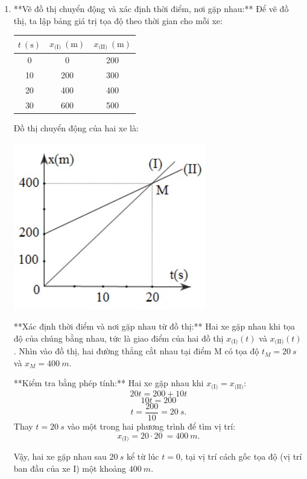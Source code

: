 \begin{vd}
{\begin{enumerate}[label=\alph*)]
			\item **Vẽ đồ thị chuyển động và xác định thời điểm, nơi gặp nhau:**
			Để vẽ đồ thị, ta lập bảng giá trị tọa độ theo thời gian cho mỗi xe:
			\begin{center}
				\begin{tabular}{|c|c|c|}
					\hline
					$t\ (\si{\second})$ & $x_{\text{(I)}}\ (\si{\meter})$ & $x_{\text{(II)}}\ (\si{\meter})$ \\
					\hline
					0 & 0 & 200 \\
					10 & 200 & 300 \\
					20 & 400 & 400 \\
					30 & 600 & 500 \\
					\hline
				\end{tabular}
			\end{center}
			Đồ thị chuyển động của hai xe là:
			\begin{center}
				\includegraphics[scale=0.8]{figs/G10Y25B3-23}
			\end{center}
			
			**Xác định thời điểm và nơi gặp nhau từ đồ thị:**
			Hai xe gặp nhau khi tọa độ của chúng bằng nhau, tức là giao điểm của hai đồ thị $x_{\text{(I)}}(t)$ và $x_{\text{(II)}}(t)$.
			Nhìn vào đồ thị, hai đường thẳng cắt nhau tại điểm M có tọa độ $t_M=\SI{20}{s}$ và $x_M=\SI{400}{m}$.
			
			**Kiểm tra bằng phép tính:**
			Hai xe gặp nhau khi $x_{\text{(I)}} = x_{\text{(II)}}$:
			$$20t = 200 + 10t$$
			$$10t = 200$$
			$$t = \dfrac{200}{10} = \SI{20}{s}.$$
			Thay $t = \SI{20}{s}$ vào một trong hai phương trình để tìm vị trí:
			$$x_{\text{(I)}} = 20 \cdot \SI{20}{} = \SI{400}{m}.$$
			
			Vậy, hai xe gặp nhau sau $\SI{20}{s}$ kể từ lúc $t=0$, tại vị trí cách gốc tọa độ (vị trí ban đầu của xe I) một khoảng $\SI{400}{m}$.
		\end{enumerate}	
	}
\end{vd}
